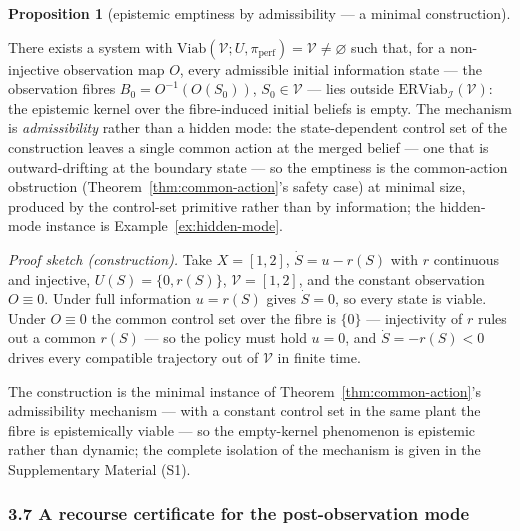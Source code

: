 \documentclass[10pt,twocolumn]{article}
\theoremstyle{definition}
\newtheorem{proposition}{Proposition}
\begin{document}
\begin{proposition}[epistemic emptiness by admissibility --- a minimal construction]\label{prop:emptiness}

There exists a system with
\(\mathrm{Viab}(\mathcal{V}; U, \pi_{\mathrm{perf}}) = \mathcal{V} \neq \varnothing\)
such that, for a non-injective observation map \(O\), every admissible
initial information state --- the observation fibres
\(B_0 = O^{-1}(O(S_0))\), \(S_0 \in \mathcal{V}\) --- lies outside
\(\mathrm{ERViab}_{\mathcal{I}}(\mathcal{V})\): the epistemic kernel
over the fibre-induced initial beliefs is empty. The mechanism is \emph{admissibility} rather than a hidden mode: the
state-dependent control set of the construction leaves a single common
action at the merged belief --- one that is outward-drifting at the
boundary state --- so the emptiness is the common-action obstruction
(Theorem~\ref{thm:common-action}'s safety case) at minimal size, produced by the control-set primitive rather than by information; the
hidden-mode instance is Example~\ref{ex:hidden-mode}.

\end{proposition}

\emph{Proof sketch (construction).} Take \(X = [1,2]\), \(\dot S = u - r(S)\) with \(r\) continuous and injective, \(U(S) = \{0, r(S)\}\), \(\mathcal{V} = [1,2]\), and the constant observation \(O \equiv 0\). Under full information \(u = r(S)\) gives \(\dot S = 0\), so every state is viable. Under \(O \equiv 0\) the common control set over the fibre is \(\{0\}\) --- injectivity of \(r\) rules out a common \(r(S)\) --- so the policy must hold \(u = 0\), and \(\dot S = -r(S) < 0\) drives every compatible trajectory out of \(\mathcal{V}\) in finite time.

The construction is the minimal instance of Theorem~\ref{thm:common-action}'s admissibility mechanism --- with a constant control set in the same plant the fibre is epistemically viable --- so the empty-kernel phenomenon is epistemic rather than dynamic; the complete isolation of the mechanism is given in the Supplementary Material (S1).

\subsubsection{3.7 A recourse certificate for the post-observation
mode}\label{recourse-certificate}
\end{document}

